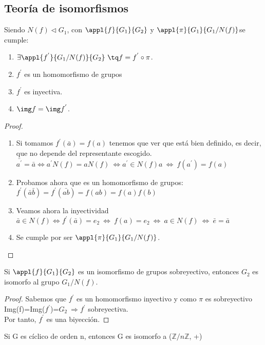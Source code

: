 \documentclass[nochap]{apuntes}
\begin{document}
\subsection{Teoría de isomorfismos}
\begin{theorem}
 Siendo $N(f)\lhd G_1$, con $\appl{f}{G_1}{G_2}$ y $\appl{\pi}{G_1}{G_1/N(f)}$se cumple:
 \begin{enumerate}
  \item $\exists \appl{f^{'}}{G_1/N(f)}{G_2} \ \tq f=f^{'}\circ \pi$.
  \item $f^{'}$  es un homomorfismo de grupos
  \item $f^{'}$  es inyectiva.
  \item $\img f =\img f^{'}$.
 \end{enumerate}
\end{theorem}

\begin{proof}
 \begin{enumerate}
  \item Si tomamos $f^{'}(\bar{a})=f(a)$  tenemos que ver que está bien definido, es decir, que no depende del representante escogido.\\
  $\bar{a^{'}}=\bar{a} \Leftrightarrow a^{'}N(f)=aN(f) \ \Leftrightarrow a^{'}\in N(f)a \ \Leftrightarrow \ f(a^{'})=f(a)$
  \item Probamos ahora que es un homomorfismo de grupos:\\
  $ f^{'}(\bar{a}\bar{b})=f^{'}(\bar{ab})=f(ab)=f(a)f(b)$
  \item Veamos ahora la inyectividad\\
  $\bar{a}\in N(f) \Leftrightarrow f^{'}(\bar{a})=e_2 \ \Leftrightarrow \ f(a)=e_2 \ \Leftrightarrow \ a\in N(f) \ \Leftrightarrow \ \bar{e}=\bar{a}$
  \item Se cumple por ser $\appl{\pi}{G_1}{G_1/N(f)}$.
 \end{enumerate}
\end{proof}

\begin{theorem}\label{thmIsoGrII}
 Si $\appl{f}{G_1}{G_2}$  es un isomorfismo de grupos sobreyectivo, entonces $G_2$  es isomorfo al grupo $G_1/N(f)$.
\end{theorem}
\begin{proof}
 Sabemos que $f^{'}$  es un homomorfismo inyectivo y como $\pi$  es sobreyectivo Img(f)=Img($f^{'}$)=$G_2 \ \Rightarrow f^{'}$ sobreyectiva.\\
 Por tanto, $f^{'}$  es una biyección.
\end{proof}
\begin{corol}
 Si G es cíclico de orden n, entonces G es isomorfo a ($\mathbb{Z}/n\mathbb{Z}$, +)
\end{corol}
\end{document}
